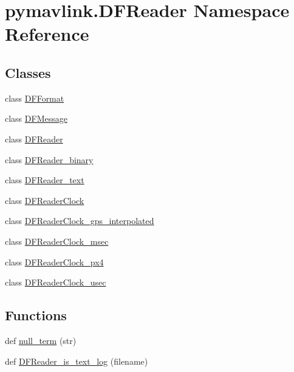 \hypertarget{namespacepymavlink_1_1DFReader}{}\section{pymavlink.\+D\+F\+Reader Namespace Reference}
\label{namespacepymavlink_1_1DFReader}
\subsection*{Classes}
\begin{DoxyCompactItemize}
\item 
class \hyperlink{classpymavlink_1_1DFReader_1_1DFFormat}{D\+F\+Format}
\item 
class \hyperlink{classpymavlink_1_1DFReader_1_1DFMessage}{D\+F\+Message}
\item 
class \hyperlink{classpymavlink_1_1DFReader_1_1DFReader}{D\+F\+Reader}
\item 
class \hyperlink{classpymavlink_1_1DFReader_1_1DFReader__binary}{D\+F\+Reader\+\_\+binary}
\item 
class \hyperlink{classpymavlink_1_1DFReader_1_1DFReader__text}{D\+F\+Reader\+\_\+text}
\item 
class \hyperlink{classpymavlink_1_1DFReader_1_1DFReaderClock}{D\+F\+Reader\+Clock}
\item 
class \hyperlink{classpymavlink_1_1DFReader_1_1DFReaderClock__gps__interpolated}{D\+F\+Reader\+Clock\+\_\+gps\+\_\+interpolated}
\item 
class \hyperlink{classpymavlink_1_1DFReader_1_1DFReaderClock__msec}{D\+F\+Reader\+Clock\+\_\+msec}
\item 
class \hyperlink{classpymavlink_1_1DFReader_1_1DFReaderClock__px4}{D\+F\+Reader\+Clock\+\_\+px4}
\item 
class \hyperlink{classpymavlink_1_1DFReader_1_1DFReaderClock__usec}{D\+F\+Reader\+Clock\+\_\+usec}
\end{DoxyCompactItemize}
\subsection*{Functions}
\begin{DoxyCompactItemize}
\item 
def \hyperlink{namespacepymavlink_1_1DFReader_a8115bbdbaaf67363fe3dadcc165a51db}{null\+\_\+term} (str)
\item 
def \hyperlink{namespacepymavlink_1_1DFReader_ae34df4fd2613fd70e018a0d4f460e082}{D\+F\+Reader\+\_\+is\+\_\+text\+\_\+log} (filename)
\end{DoxyCompactItemize}

